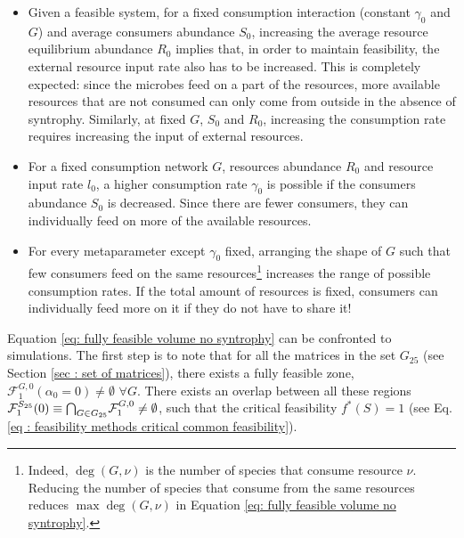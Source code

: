 \documentclass[12pt, titlepage]{report}
\begin{document}
\begin{itemize}
\item Given a feasible system, for a fixed consumption interaction (\ie constant $\gamma_0$ and $G$) and average consumers abundance $S_0$, increasing the average resource equilibrium abundance $R_0$ implies that, in order to maintain feasibility, the external resource input rate also has to be increased. This is completely expected: since the microbes feed on a part of the resources, more available resources that are not consumed can only come from outside in the absence of syntrophy. Similarly, at fixed $G$, $S_0$ and $R_0$, increasing the consumption rate requires increasing the input of external resources.

\item For a fixed consumption network $G$, resources abundance $R_0$ and resource input rate $l_0$, a higher consumption rate $\gamma_0$ is possible if the consumers abundance $S_0$ is decreased. Since there are fewer consumers, they can individually feed on more of the available resources.
\item For every metaparameter except $\gamma_0$ fixed, arranging the shape of $G$ such that few consumers feed on the same resources\footnote{Indeed, $\deg(G,\nu)$ is the number of species that consume resource $\nu$. Reducing the number of species that consume from the same resources reduces $\max{\deg(G,\nu)}$ in Equation \eqref{eq: fully feasible volume no syntrophy}.} increases the range of possible consumption rates. If the total amount of resources is fixed, consumers can individually feed more on it if they do not have to share it!
\end{itemize}
Equation \eqref{eq: fully feasible volume no syntrophy} can be confronted to simulations.
The first step is to note that for all the matrices in the set $G_{25}$ (see Section \ref{sec : set of matrices}), there exists a fully feasible zone, \ie $\mathcal{F}^{G, 0}_1(\alpha_0=0) \neq \emptyset$ $ \forall G$. There exists an overlap between all these regions $\mathcal{F}_1^{S_{25}}(0) \equiv {\bigcap}_{G \in G_{25}} \mathcal{F}^{G,0}_1 \neq \emptyset$, such that the critical feasibility $f^*(S)=1$ (see Eq.\eqref{eq : feasibility methods critical common feasibility}).
\end{document}
